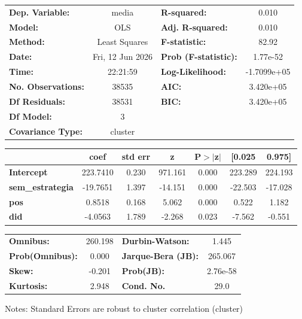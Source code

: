 \begin{center}
\begin{tabular}{lclc}
\toprule
\textbf{Dep. Variable:}    &      media       & \textbf{  R-squared:         } &      0.010   \\
\textbf{Model:}            &       OLS        & \textbf{  Adj. R-squared:    } &      0.010   \\
\textbf{Method:}           &  Least Squares   & \textbf{  F-statistic:       } &      82.92   \\
\textbf{Date:}             & Fri, 12 Jun 2026 & \textbf{  Prob (F-statistic):} &   1.77e-52   \\
\textbf{Time:}             &     22:21:59     & \textbf{  Log-Likelihood:    } & -1.7099e+05  \\
\textbf{No. Observations:} &       38535      & \textbf{  AIC:               } &  3.420e+05   \\
\textbf{Df Residuals:}     &       38531      & \textbf{  BIC:               } &  3.420e+05   \\
\textbf{Df Model:}         &           3      & \textbf{                     } &              \\
\textbf{Covariance Type:}  &     cluster      & \textbf{                     } &              \\
\bottomrule
\end{tabular}
\begin{tabular}{lcccccc}
                         & \textbf{coef} & \textbf{std err} & \textbf{z} & \textbf{P$> |$z$|$} & \textbf{[0.025} & \textbf{0.975]}  \\
\midrule
\textbf{Intercept}       &     223.7410  &        0.230     &   971.161  &         0.000        &      223.289    &      224.193     \\
\textbf{sem\_estrategia} &     -19.7651  &        1.397     &   -14.151  &         0.000        &      -22.503    &      -17.028     \\
\textbf{pos}             &       0.8518  &        0.168     &     5.062  &         0.000        &        0.522    &        1.182     \\
\textbf{did}             &      -4.0563  &        1.789     &    -2.268  &         0.023        &       -7.562    &       -0.551     \\
\bottomrule
\end{tabular}
\begin{tabular}{lclc}
\textbf{Omnibus:}       & 260.198 & \textbf{  Durbin-Watson:     } &    1.445  \\
\textbf{Prob(Omnibus):} &   0.000 & \textbf{  Jarque-Bera (JB):  } &  265.067  \\
\textbf{Skew:}          &  -0.201 & \textbf{  Prob(JB):          } & 2.76e-58  \\
\textbf{Kurtosis:}      &   2.948 & \textbf{  Cond. No.          } &     29.0  \\
\bottomrule
\end{tabular}
\end{center}

Notes: \newline
 [1] Standard Errors are robust to cluster correlation (cluster)